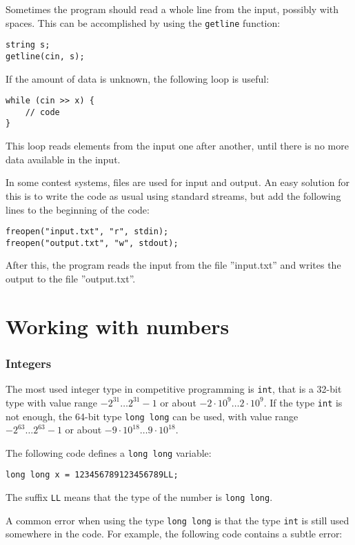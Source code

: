 Sometimes the program should read a whole line
from the input, possibly with spaces.
This can be accomplished by using the
\texttt{getline} function:

\begin{lstlisting}
string s;
getline(cin, s);
\end{lstlisting}

If the amount of data is unknown, the following
loop is useful:
\begin{lstlisting}
while (cin >> x) {
    // code
}
\end{lstlisting}
This loop reads elements from the input
one after another, until there is no
more data available in the input.

In some contest systems, files are used for
input and output.
An easy solution for this is to write
the code as usual using standard streams,
but add the following lines to the beginning of the code:
\begin{lstlisting}
freopen("input.txt", "r", stdin);
freopen("output.txt", "w", stdout);
\end{lstlisting}
After this, the program reads the input from the file
''input.txt'' and writes the output to the file
''output.txt''.

\section{Working with numbers}


\subsubsection{Integers}

The most used integer type in competitive programming
is \texttt{int}, that is a 32-bit type with
value range $-2^{31} \ldots 2^{31}-1$
or about $-2 \cdot 10^9 \ldots 2 \cdot 10^9$.
If the type \texttt{int} is not enough,
the 64-bit type \texttt{long long} can be used,
with value range $-2^{63} \ldots 2^{63}-1$
or about $-9 \cdot 10^{18} \ldots 9 \cdot 10^{18}$.

The following code defines a
\texttt{long long} variable:
\begin{lstlisting}
long long x = 123456789123456789LL;
\end{lstlisting}
The suffix \texttt{LL} means that the
type of the number is \texttt{long long}.

A common error when using the type \texttt{long long}
is that the type \texttt{int} is still used somewhere
in the code.
For example, the following code contains
a subtle error:

